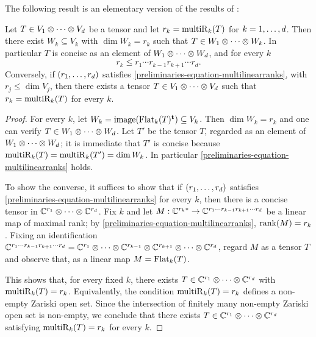 The following result is an elementary version of the results of \cite{CK11}:
\begin{lemma}
\label{preliminaries-lemma-multilinearranksineq}
 Let $T \in V_1 \otimes \cdots \otimes V_d$ be a tensor and let $r_k = \mathrm{multiR}_k(T)$ for $k=1 , \ldots , d$. Then there exist $W_k \subseteq V_k$ with $\dim W_k = r_k$ such that $T \in W_1 \otimes \cdots \otimes W_k$. In particular $T$ is concise as an element of $W_1 \otimes \cdots \otimes W_d$, and for every $k$
 \begin{equation}
  \label{preliminaries-equation-multilinearranks}
 r_k \leq r_1 \cdots r_{k-1} r_{k+1} \cdots r_d.
 \end{equation}
Conversely, if $(r_1 , \ldots , r_d)$ satisfies \eqref{preliminaries-equation-multilinearranks}, with $r_j \leq \dim V_j$, then there exists a tensor $T \in V_1 \otimes \cdots \otimes V_d$ such that $r_k = \mathrm{multiR}_k(T)$ for every $k$.
\end{lemma}
\begin{proof}
For every $k$, let $W_k = \mathrm{image} (  \mathrm{Flat}_k(T)^{\mathbf{t}} ) \subseteq V_k$. Then $\dim W_k = r_k$ and one can verify $T \in W_1 \otimes \cdots \otimes W_d$. Let $T'$ be the tensor $T$, regarded as an element of $W_1 \otimes \cdots \otimes W_d$; it is immediate that $T'$ is concise because $\mathrm{multiR}_k(T) = \mathrm{multiR}_k(T') = \dim W_k$. In particular \eqref{preliminaries-equation-multilinearranks} holds.

To show the converse, it suffices to show that if $(r_1 , \ldots , r_d)$ satisfies \eqref{preliminaries-equation-multilinearranks} for every $k$, then there is a concise tensor in $\mathbb{C}^{r_1} \otimes \cdots \otimes \mathbb{C}^{r_d}$. Fix $k$ and let $M : \mathbb{C}^{r_k *} \to \mathbb{C}^{r_1 \cdots r_{k-1}r_{k+1} \cdots r_d}$ be a linear map of maximal rank; by \eqref{preliminaries-equation-multilinearranks}, $\mathrm{rank}(M) = r_k$. Fixing an identification $\mathbb{C}^{r_1 \cdots r_{k-1}r_{k+1} \cdots r_d} = \mathbb{C}^{r_1} \otimes \cdots \otimes \mathbb{C}^{r_{k-1}} \otimes \mathbb{C}^{r_{k+1}} \otimes \cdots \otimes \mathbb{C}^{r_d}$, regard $M$ as a tensor $T$ and observe that, as a linear map $M = \mathrm{Flat}_k(T)$.

This shows that, for every fixed $k$, there exists $T \in \mathbb{C}^{r_1} \otimes \cdots \otimes \mathbb{C}^{r_d}$ with $\mathrm{multiR}_k(T) = r_k$. Equivalently, the condition $\mathrm{multiR}_k(T) = r_k$ defines a non-empty Zariski open set. Since the intersection of finitely many non-empty Zariski open set is non-empty, we conclude that there exists $T \in \mathbb{C}^{r_1} \otimes \cdots \otimes \mathbb{C}^{r_d}$ satisfying $\mathrm{multiR}_k(T) = r_k$ for every $k$. 
\end{proof}

